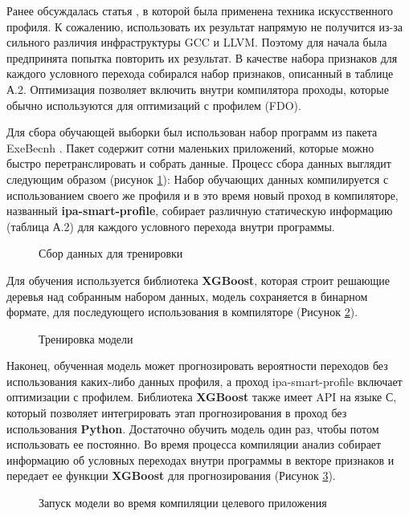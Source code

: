 Ранее обсуждалась статья  \cite{rotem2021profile}, в которой была применена техника искусственного профиля. К сожалению, использовать их результат напрямую не получится из-за сильного различия инфраструктуры  GCC и LLVM. Поэтому для начала была предпринята попытка повторить их результат. В качестве набора признаков для каждого условного перехода собирался набор признаков, описанный в таблице А.2. Оптимизация позволяет включить внутри компилятора проходы, которые обычно используются для оптимизаций с профилем (FDO).

Для сбора обучающей выборки был использован набор программ из пакета ExeBecnh \cite{armengol2022exebench}. Пакет содержит сотни маленьких приложений, которые можно быстро перетранслировать и собрать данные. Процесс сбора данных выглядит следующим образом (рисунок \ref{op:mlpgo1}): Набор обучающих данных компилируется  с использованием своего же профиля и в это время новый проход в компиляторе, названный \textbf{ipa-smart-profile}, собирает различную статическую информацию (таблица А.2) для каждого условного перехода внутри программы. 

\begin{figure}[htbp]
	\centering
	
	\caption{Сбор данных для тренировки}
	\label{op:mlpgo1}
\end{figure}

Для обучения используется библиотека \textbf{XGBoost}, которая строит решающие деревья над собранным набором данных, модель сохраняется в бинарном формате, для последующего использования в компиляторе (Рисунок \ref{op:mlpgo2}).

\begin{figure}[htbp]
	\centering
	
	\caption{Тренировка модели}
	\label{op:mlpgo2}
\end{figure}
Наконец, обученная модель может прогнозировать вероятности  переходов  без использования каких-либо данных профиля, а проход ipa-smart-profile включает оптимизации с профилем. Библиотека \textbf{XGBoost} также имеет API на языке С, который позволяет интегрировать этап прогнозирования в проход без использования \textbf{Python}. Достаточно обучить модель один раз, чтобы потом использовать ее постоянно. Во время процесса компиляции анализ собирает информацию об условных переходах  внутри программы в векторе признаков и передает ее функции \textbf{XGBoost} для прогнозирования (Рисунок \ref{op:mlpgo3}).
\begin{figure}[htbp]
	\centering
	
	\caption{Запуск модели во время компиляции целевого приложения}
	\label{op:mlpgo3}
\end{figure}


